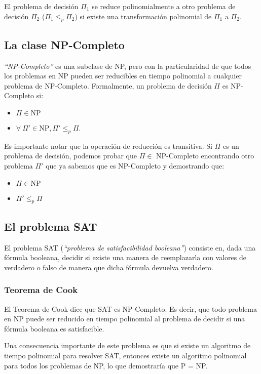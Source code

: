 El problema de decisi\'on $\Pi_1$ se reduce polinomialmente a otro problema de decisi\'on $\Pi_2$ ($\Pi_1 \leq_p \Pi_2$) si existe una transformaci\'on polinomial de $\Pi_1$ a $\Pi_2$.

\subsection{La clase NP-Completo}

\emph{``NP-Completo''} es una subclase de NP, pero con la particularidad de que todos los problemas en NP pueden ser reducibles en tiempo polinomial a cualquier problema de NP-Completo. Formalmente, un problema de decisi\'on $\Pi$ es NP-Completo si:

\begin{itemize}
\item $\Pi \in \textrm{NP}$
\item $\forall\ \Pi' \in \textrm{NP}, \Pi' \leq_p \Pi$.
\end{itemize} 

Es importante notar que la operaci\'on de reducci\'on es transitiva. Si $\Pi$ es un problema de decisi\'on, podemos probar que $\Pi \in$ NP-Completo encontrando otro problema $\Pi'$ que ya sabemos que es NP-Completo y demostrando que:

\begin{itemize}
\item $\Pi \in \textrm{NP}$
\item $\Pi' \leq_p \Pi$
\end{itemize} 

\subsection{El problema SAT}

El problema SAT (\emph{``problema de satisfacibilidad booleana''}) consiste en, dada una f\'ormula booleana, decidir si existe una manera de reemplazarla con valores de verdadero o falso de manera que dicha f\'ormula devuelva verdadero.

\subsubsection{Teorema de Cook}

El Teorema de Cook dice que SAT es NP-Completo. Es decir, que todo problema en NP puede ser reducido en tiempo polinomial al problema de decidir si una f\'ormula booleana es satisfacible.

Una consecuencia importante de este problema es que si existe un algoritmo de tiempo polinomial para resolver SAT, entonces existe un algoritmo polinomial para todos los problemas de NP, lo que demostrar\'ia que P = NP.


